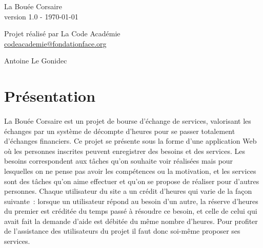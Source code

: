 \documentclass[french]{article}
\begin{document}
	
	\begin{titlepage}
		\begin{center}
			
			\vspace*{\fill}
			
			{\Huge
				La Bouée Corsaire
			}\\ [0.5cm]
			{\large
				version 1.0 - \today
			}\\
			
			\vspace*{\fill}
			
			{\Large
				Projet réalisé par La Code Académie
			}\\ [0.5cm]
			{\large
				\href{mailto:codeacademie@fondationface.org}{
					codeacademie@fondationface.org
				}
			}\\
			
			\vspace*{\fill}
			
			{\Large
				Antoine Le Gonidec
			}
			
			\vspace*{\fill}
			
		\end{center}
	\end{titlepage}
	
	\newpage
	\tableofcontents
	
	\newpage
	\section{Présentation}
		\paragraph{}
			La Bouée Corsaire est un projet de bourse d’échange de services,
			 valorisant les échanges par un système de décompte d’heures pour se
			 passer totalement d’échanges financiers. Ce projet se présente sous la
			 forme d’une application Web où les personnes inscrites peuvent
			 enregistrer des besoins et des services. Les besoins correspondent aux
			 tâches qu’on souhaite voir réalisées mais pour lesquelles on ne pense pas
			 avoir les compétences ou la motivation, et les services sont des tâches
			 qu’on aime effectuer et qu’on se propose de réaliser pour d’autres
			 personnes. Chaque utilisateur du site a un crédit d’heures qui varie de
			 la façon suivante : lorsque un utilisateur répond au besoin d’un autre,
			 la réserve d’heures du premier est créditée du temps passé à résoudre ce
			 besoin, et celle de celui qui avait fait la demande d’aide est débitée du
			 même nombre d’heures. Pour profiter de l’assistance des utilisateurs du
			 projet il faut donc soi-même proposer ses services.
\end{document}
